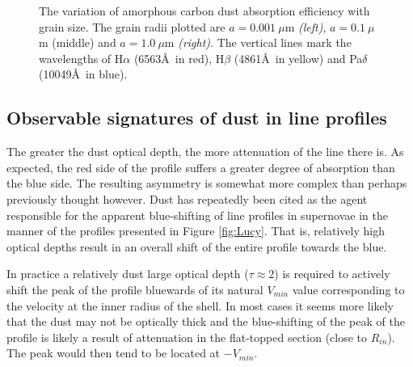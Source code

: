 \documentclass[useAMS,usenatbib,usegraphicx]{mnras}
\begin{document}
\begin{figure}
\caption{The variation of amorphous carbon dust absorption efficiency with grain size. The grain radii plotted are $a=0.001~\mu$m \textit{(left)}, $a=0.1~\mu$m (middle) and $a=1.0~\mu$m \textit{(right)}.  The vertical lines mark the wavelengths of H$\alpha$ (6563\AA\ in red), H$\beta$ (4861\AA\ in yellow) and Pa$\delta$ (10049\AA\ in blue).}
\label{wav_dep2}
\end{figure}






\subsection{Observable signatures of dust in line profiles}
\label{asym}

The greater the dust optical depth, the more attenuation of the line 
there is.  As expected, the red side of the profile suffers a greater 
degree of absorption than the blue side.  The resulting asymmetry is 
somewhat more complex than perhaps previously thought however.  Dust has 
repeatedly been cited as the agent responsible for the apparent 
blue-shifting of line profiles in supernovae in the manner of the profiles 
presented in Figure \ref{fig:Lucy}.  That is, relatively high optical 
depths result in an overall shift of the entire profile towards the blue.

In practice a relatively dust large optical depth ($\tau \approx 2$) is 
required to actively shift the peak of the profile bluewards of its natural 
$V_{min}$ value corresponding to the velocity at the inner radius of the shell.  In most cases it seems more likely that the dust
may not be optically thick and the blue-shifting of the peak of the profile is 
likely a result of attenuation in the flat-topped section (close to 
$R_{in}$).  The peak would then tend to be located at $-V_{min}$.
\end{document}
